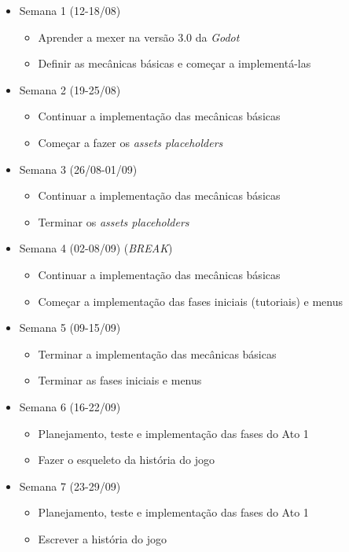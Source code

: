 \documentclass[a4paper, 11pt]{article}
\begin{document}
\begin{itemize} 
\item Semana 1 (12-18/08)
 \begin{itemize} 
 \item Aprender a mexer na versão 3.0 da \textit{Godot}
 \item Definir as mecânicas básicas e começar a implementá-las
  \end{itemize}

\item Semana 2 (19-25/08)
 \begin{itemize} 
 \item Continuar a implementação das mecânicas básicas
 \item Começar a fazer os \textit{assets placeholders}
 \end{itemize}

\item Semana 3 (26/08-01/09)
 \begin{itemize} 
 \item Continuar a implementação das mecânicas básicas
 \item Terminar os \textit{assets placeholders}
 \end{itemize}

\item Semana 4 (02-08/09) (\textit{BREAK})
 \begin{itemize} 
 \item Continuar a implementação das mecânicas básicas
 \item Começar a implementação das fases iniciais (tutoriais) e menus
 \end{itemize}

\item Semana 5 (09-15/09)
 \begin{itemize} 
 \item Terminar a implementação das mecânicas básicas
 \item Terminar as fases iniciais e menus
 \end{itemize}

\item Semana 6 (16-22/09)
 \begin{itemize} 
 \item Planejamento, teste e implementação das fases do Ato 1
 \item Fazer o esqueleto da história do jogo
 \end{itemize}

\item Semana 7 (23-29/09)
 \begin{itemize} 
 \item Planejamento, teste e implementação das fases do Ato 1
 \item Escrever a história do jogo
 \end{itemize}


\end{itemize}
\end{document}
